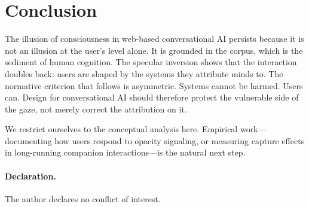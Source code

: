 \documentclass[sigconf]{acmart}
\begin{document}
\section{Conclusion}
\label{sec:conclusion}

The illusion of consciousness in web-based conversational AI persists because it is not an illusion at the user's level alone. It is grounded in the corpus, which is the sediment of human cognition. The specular inversion shows that the interaction doubles back: users are shaped by the systems they attribute minds to. The normative criterion that follows is asymmetric. Systems cannot be harmed. Users can. Design for conversational AI should therefore protect the vulnerable side of the gaze, not merely correct the attribution on it.

We restrict ourselves to the conceptual analysis here. Empirical work---documenting how users respond to opacity signaling, or measuring capture effects in long-running companion interactions---is the natural next step.

\paragraph*{Declaration.}
The author declares no conflict of interest.



\end{document}
